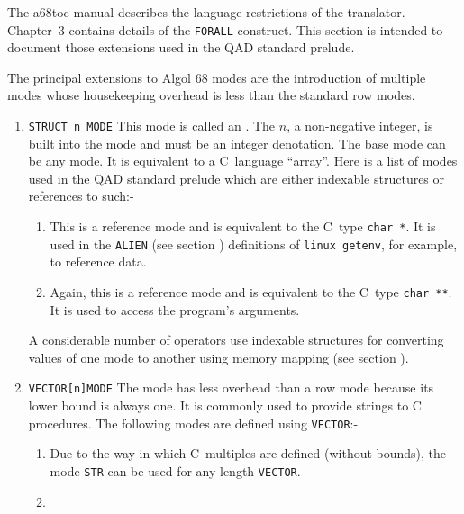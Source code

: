 The a68toc manual describes the language restrictions of the
translator. Chapter~3 contains details of the \verb|FORALL|
construct.  This section is intended to document those extensions
used in the QAD standard prelude.

The principal extensions to Algol 68 modes are the introduction of
multiple modes whose housekeeping overhead is less than the standard
row modes.
\begin{enumerate}
\item \verb|STRUCT n MODE|\newline
This mode is called an .  The $n$, a non-negative integer, is built into the mode
and must be an integer denotation. The base mode can be any mode. It
is equivalent to a C~language ``array''.  Here is a list of modes
used in the QAD standard prelude which are either indexable
structures or references to such:-
\begin{enumerate}
\item {}\newline
This is a reference mode and is equivalent to the C~type \verb|char *|.
It is used in the \verb|ALIEN| (see section )
definitions of \verb|linux getenv|, for example, to reference
data.
\item {}\newline
Again, this is a reference mode and is equivalent to the C~type
\verb|char **|. It is used to access the program's arguments.
\end{enumerate}
A considerable number of operators use indexable structures for
converting values of one mode to another using memory mapping (see
section ).
\item \verb|VECTOR[n]MODE| \newline
The  mode has less overhead than a row mode because its
lower bound is always one. It is commonly used to provide strings to
C procedures. The following modes are defined using \verb|VECTOR|:-
\begin{enumerate}
\item {}\newline
Due to the way in which C~multiples are defined (without bounds), the
mode \verb|STR| can be used for any length \verb|VECTOR|.
\item {}\hypertarget{stan-RVC}{}\label{stan-RVC}\newline

\end{enumerate}
\end{enumerate}
